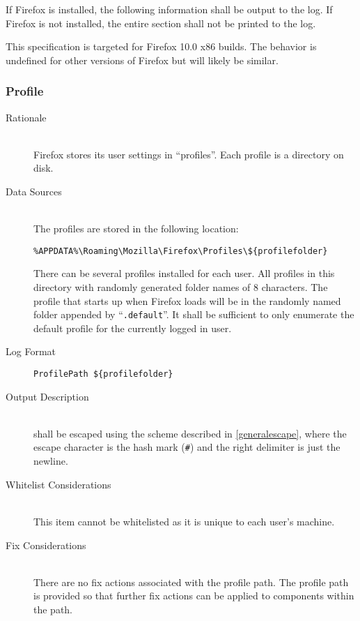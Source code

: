 If Firefox is installed, the following information shall be output to the log. 
If Firefox is not installed, the entire section shall not be printed to the log.

This specification is targeted for Firefox 10.0 x86 builds.  The behavior is
undefined for other versions of Firefox but will likely be similar.

\subsubsection{Profile}
\begin{description}
\item[Rationale] \hfill \\
Firefox stores its user settings in ``profiles''.  Each profile is a directory
on disk.  
\item[Data Sources] \hfill \\
The profiles are stored in the following location:
\vspace{-\baselineskip}
\begin{verbatim}
%APPDATA%\Roaming\Mozilla\Firefox\Profiles\${profilefolder}
\end{verbatim}
There can be several profiles installed for each user.   All profiles in this
directory with randomly generated folder names of 8 characters.  The profile
that starts up when Firefox loads will be in the randomly named folder appended
by ``\verb|.default|''.  It shall be sufficient to only enumerate the default
profile for the currently logged in user.
\item[Log Format] \hfill 
\vspace{-\baselineskip}
\begin{verbatim}
ProfilePath ${profilefolder}
\end{verbatim}
\item[Output Description] \hfill \\
 shall be escaped using the scheme described in
\ref{generalescape}, where the escape character is the hash mark (\verb|#|) and
the right delimiter is just the newline.
\item[Whitelist Considerations] \hfill \\
This item cannot be whitelisted as it is unique to each user's machine.
\item[Fix Considerations] \hfill \\
There are no fix actions associated with the profile path.  The profile path is
provided so that further fix actions can be applied to components within the
path.
\end{description}

